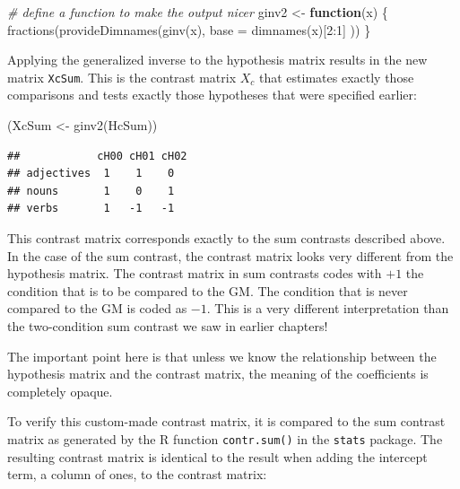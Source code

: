 \documentclass[
  12pt,
]{krantz}
\newenvironment{Shaded}{\begin{snugshade}}{\end{snugshade}}
\newcommand{\AttributeTok}[1]{\textcolor[rgb]{0.77,0.63,0.00}{#1}}
\newcommand{\CommentTok}[1]{\textcolor[rgb]{0.56,0.35,0.01}{\textit{#1}}}
\newcommand{\ControlFlowTok}[1]{\textcolor[rgb]{0.13,0.29,0.53}{\textbf{#1}}}
\newcommand{\DecValTok}[1]{\textcolor[rgb]{0.00,0.00,0.81}{#1}}
\newcommand{\FunctionTok}[1]{\textcolor[rgb]{0.00,0.00,0.00}{#1}}
\newcommand{\NormalTok}[1]{#1}
\newcommand{\OtherTok}[1]{\textcolor[rgb]{0.56,0.35,0.01}{#1}}
\newcommand{\SpecialCharTok}[1]{\textcolor[rgb]{0.00,0.00,0.00}{#1}}
\theoremstyle{definition}
\theoremstyle{definition}
\theoremstyle{definition}
\theoremstyle{definition}
\theoremstyle{remark}
\begin{document}
\begin{Shaded}
\begin{Highlighting}[]
\CommentTok{\# define a function to make the output nicer}
\NormalTok{ginv2 }\OtherTok{\textless{}{-}} \ControlFlowTok{function}\NormalTok{(x) \{}
  \FunctionTok{fractions}\NormalTok{(}\FunctionTok{provideDimnames}\NormalTok{(}\FunctionTok{ginv}\NormalTok{(x),}
    \AttributeTok{base =} \FunctionTok{dimnames}\NormalTok{(x)[}\DecValTok{2}\SpecialCharTok{:}\DecValTok{1}\NormalTok{]}
\NormalTok{  ))}
\NormalTok{\}}
\end{Highlighting}
\end{Shaded}

Applying the generalized inverse to the hypothesis matrix results in the new matrix \texttt{XcSum}. This is the contrast matrix \(X_c\) that estimates exactly those comparisons and tests exactly those hypotheses that were specified earlier:

\begin{Shaded}
\begin{Highlighting}[]
\NormalTok{(XcSum }\OtherTok{\textless{}{-}} \FunctionTok{ginv2}\NormalTok{(HcSum))}
\end{Highlighting}
\end{Shaded}

\begin{verbatim}
##            cH00 cH01 cH02
## adjectives  1    1    0  
## nouns       1    0    1  
## verbs       1   -1   -1
\end{verbatim}

This contrast matrix corresponds exactly to the sum contrasts described above. In the case of the sum contrast, the contrast matrix looks very different from the hypothesis matrix. The contrast matrix in sum contrasts codes with \(+1\) the condition that is to be compared to the GM. The condition that is never compared to the GM is coded as \(-1\). This is a very different interpretation than the two-condition sum contrast we saw in earlier chapters!

The important point here is that unless we know the relationship between the hypothesis matrix and the contrast matrix, the meaning of the coefficients is completely opaque.

To verify this custom-made contrast matrix, it is compared to the sum contrast matrix as generated by the R function \texttt{contr.sum()} in the \texttt{stats} package. The resulting contrast matrix is identical to the result when adding the intercept term, a column of ones, to the contrast matrix:
\end{document}
